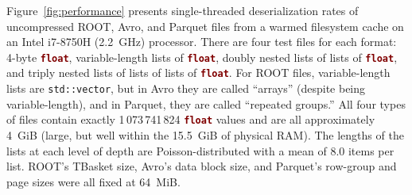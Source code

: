 \documentclass{webofc}
\begin{document}
\vspace{-0.1 cm}
Figure~\ref{fig:performance} presents single-threaded deserialization rates of uncompressed ROOT, Avro, and Parquet files from a warmed filesystem cache on an Intel i7-8750H (2.2~GHz) processor. There are four test files for each format: 4-byte \textcolor{Maroon}{\tt\textbf{float}}, variable-length lists of \textcolor{Maroon}{\tt\textbf{float}}, doubly nested lists of lists of \textcolor{Maroon}{\tt\textbf{float}}, and triply nested lists of lists of lists of \textcolor{Maroon}{\tt\textbf{float}}. For ROOT files, variable-length lists are {\tt std::vector}, but in Avro they are called ``arrays'' (despite being variable-length), and in Parquet, they are called ``repeated groups.'' All four types of files contain exactly 1\,073\,741\,824 \textcolor{Maroon}{\tt\textbf{float}} values and are all approximately 4~GiB (large, but well within the 15.5~GiB of physical RAM). The lengths of the lists at each level of depth are Poisson-distributed with a mean of 8.0 items per list. ROOT's TBasket size, Avro's data block size, and Parquet's row-group and page sizes were all fixed at 64~MiB.
\end{document}
